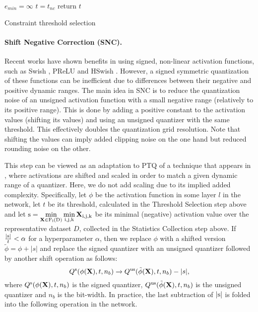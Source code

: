 \documentclass{article}
\newcommand{\brackets}[1]{\left(#1\right)}
\newcommand{\matsym}[1]{\mathbf{#1}}
\begin{document}
\begin{algorithm}[H]\label{alg:threshold_selection}
 $e_{min}=\infty$ \;
 $t=t_{nc}$  \;
 \For{i in 0 to n}{
  $t_i=\frac{t_{nc}}{2^{i}}$ \;
  $e_i=ERR\brackets{t_i,n_b}$ \;
  \If{$e_i < e_{min}$}{
    $t=t_i$ \; 
    $e_{min}=e_i$
  }
 }
 return $t$
 \caption{Constraint threshold selection}
\end{algorithm}












\paragraph{Shift Negative Correction (SNC).}  
Recent works have shown benefits in using signed, non-linear activation functions, such as Swish \cite{ramachandran2017searching}, PReLU and HSwish \cite{howard2019searching}. However, a signed symmetric quantization of these functions can be inefficient due to differences between their negative and positive dynamic ranges.
The main idea in SNC is to reduce the quantization noise of an unsigned activation function with a small negative range (relatively to its positive range). 
This is done by adding a positive constant to the activation values (shifting its values) and using an unsigned quantizer with the same threshold. This effectively doubles the quantization grid resolution.
Note that shifting the values can imply added clipping noise on the one hand but reduced rounding noise on the other.

This step can be viewed as an adaptation to PTQ of a technique that appears in \cite{bhalgat2020lsq+}, where activations are shifted and scaled in order to match a given dynamic range of a quantizer. Here, we do not add scaling due to its implied added complexity.
Specifically, let $\phi$ be the activation function in some layer $l$ in the network, let $t$ be its threshold, calculated in the Threshold Selection step above and let
$\rm{s}=\min\limits_{\matsym{X}\in F_l(D)}\min\limits_{i,j,k}\matsym{X}_{i,j,k}$ 
be its minimal (negative) activation value over the representative dataset $D$, collected in the Statistics Collection step above.
If $\frac{|\rm{s}|}{t} < \alpha$ for a hyperparameter $\alpha$, then we replace $\phi$ with a shifted version $\tilde\phi = \phi + |s|$ and replace the signed quantizer with an unsigned quantizer followed by another shift operation as follows:
\begin{equation}
    Q^{\rm{s}}(\phi(\matsym{X}), t,n_b)\xrightarrow{}Q^{\rm{us}}(\tilde{\phi}(\matsym{X}), t,n_b)-|s|,
\end{equation}
where $Q^{\rm{s}}(\phi(\matsym{X}), t,n_b)$ is the signed quantizer, $Q^{\rm{us}}(\tilde{\phi}(\matsym{X}), t,n_b)$ is the unsigned quantizer and $n_b$ is the bit-width.
In practice, the last subtraction of $|\rm{s}|$ is folded into the following operation in the network.
\end{document}
